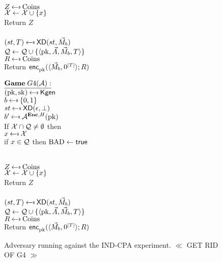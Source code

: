 \begin{figure}[tbhp]
\begin{center}
{\medskip
{}\\
  $Z \getsr \mathrm{Coins}$\\
  $\mathcal{X} \gets \mathcal{X} \cup \{x\}$\\
  Return $Z$\\

\medskip
{}\\
$(st, T) \getsr \mdalg(st,\vmsg_b)$\\
$\mathcal{Q} \gets \mathcal{Q} \cup \{\langle \mathrm{pk},\vec{A},\vec{M}_b,T\rangle\}$\\
$R \getsr \mathrm{Coins}$\\
Return ${\mathsf{enc}}_{\mathrm{pk}}^{}(\langle \vec{M}_b, 0^{|T|}\rangle; R)$\\
}
{
$\gamev{G4}{\advA}$\\
 $(\pk,\sk)\getsr\Kgen$\\
$ b \getsr \bits$\\
 $st \getsr \mdalg(\epsilon,\bot)$\\
 $b' \getsr \advA^{\encOracle,H}(\pk)$\\
 If $\mathcal{X} \cap \mathcal{Q} \neq \emptyset$ then \\
\nudge $ x \getsr \calX$\\
\nudge if $x \in \mathcal{Q}$ then $\mathrm{BAD}\gets\textsf{true}$

\medskip
{}\\
  $Z \getsr \mathrm{Coins}$\\
  $\mathcal{X} \gets \mathcal{X} \cup \{x\}$\\
  Return $Z$\\

\medskip
{}\\
$(st, T) \getsr \mdalg(st,\vmsg_b)$\\
$\mathcal{Q} \gets \mathcal{Q} \cup \{\langle \mathrm{pk},\vec{A},\vec{M}_b,T\rangle\}$\\
$R \getsr \mathrm{Coins}$\\
Return ${\mathsf{enc}}_{\mathrm{pk}}^{}(\langle \vec{M}_b, 0^{|T|}\rangle; R)$\\
}
\fi
\caption{Adversary running against the IND-CPA experiment.  $\ll$ GET
  RID OF G4 $\gg$ }
\label{fig:CPA-adv}
\end{center}
\end{figure}

